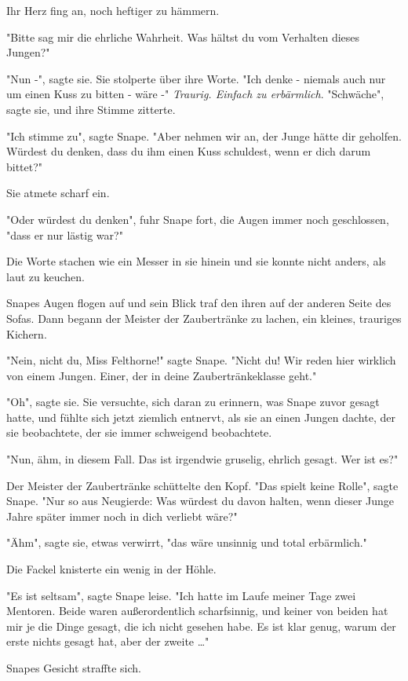 {Ihr Herz fing an, noch heftiger zu hämmern.

"Bitte sag mir die ehrliche Wahrheit. Was hältst du vom Verhalten dieses Jungen?"

"Nun -", sagte sie. Sie stolperte über ihre Worte. "Ich denke - niemals auch nur um einen Kuss zu bitten - wäre -" \emph{Traurig. Einfach zu erbärmlich}. "Schwäche", sagte sie, und ihre Stimme zitterte.

"Ich stimme zu", sagte Snape. "Aber nehmen wir an, der Junge hätte dir geholfen. Würdest du denken, dass du ihm einen Kuss schuldest, wenn er dich darum bittet?"

Sie atmete scharf ein.

"Oder würdest du denken", fuhr Snape fort, die Augen immer noch geschlossen, "dass er nur lästig war?"

Die Worte stachen wie ein Messer in sie hinein und sie konnte nicht anders, als laut zu keuchen.

Snapes Augen flogen auf und sein Blick traf den ihren auf der anderen Seite des Sofas. Dann begann der Meister der Zaubertränke zu lachen, ein kleines, trauriges Kichern.

"Nein, nicht du, Miss Felthorne!" sagte Snape. "Nicht du! Wir reden hier wirklich von einem Jungen. Einer, der in deine Zaubertränkeklasse geht."

"Oh", sagte sie. Sie versuchte, sich daran zu erinnern, was Snape zuvor gesagt hatte, und fühlte sich jetzt ziemlich entnervt, als sie an einen Jungen dachte, der sie beobachtete, der sie immer schweigend beobachtete.

"Nun, ähm, in diesem Fall. Das ist irgendwie gruselig, ehrlich gesagt. Wer ist es?"

Der Meister der Zaubertränke schüttelte den Kopf. "Das spielt keine Rolle", sagte Snape. "Nur so aus Neugierde: Was würdest du davon halten, wenn dieser Junge Jahre später immer noch in dich verliebt wäre?"

"Ähm", sagte sie, etwas verwirrt, "das wäre unsinnig und total erbärmlich."

Die Fackel knisterte ein wenig in der Höhle.

"Es ist seltsam", sagte Snape leise. "Ich hatte im Laufe meiner Tage zwei Mentoren. Beide waren außerordentlich scharfsinnig, und keiner von beiden hat mir je die Dinge gesagt, die ich nicht gesehen habe. Es ist klar genug, warum der erste nichts gesagt hat, aber der zweite …"

Snapes Gesicht straffte sich.

}
